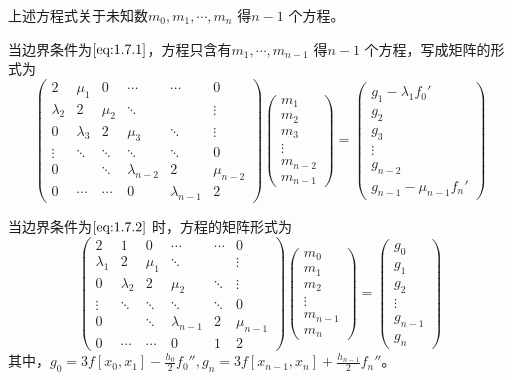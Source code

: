 \documentclass[a4paper]{article}
\begin{document}
上述方程式关于未知数$m_0, m_1, \cdots, m_n$ 得$n-1$ 个方程。

当边界条件为$\ref{eq:1.7.1}$，方程只含有$m_1, \cdots, m_{n-1}$ 得$n-1$ 个方程，写成矩阵的形式为
\[
\begin{pmatrix} 
	2 & \mu_1 & 0 & \cdots & \cdots & 0 \\
	\lambda_2 & 2 & \mu_2 & \ddots & & \vdots \\
	0 & \lambda_3 & 2 & \mu_3 & \ddots & \vdots \\
	\vdots & \ddots & \ddots & \ddots & \ddots & 0 \\
	0 & & \ddots & \lambda_{n-2} & 2 & \mu_{n-2} \\
	0 & \cdots & \cdots & 0 & \lambda_{n-1} & 2
\end{pmatrix} 
\begin{pmatrix} 
	m_1 \\ m_2 \\ m_3 \\ \vdots \\ m_{n-2} \\ m_{n-1}
\end{pmatrix} = 
\begin{pmatrix} 
	g_1 - \lambda_1 f_{0}' \\ g_2 \\ g_3 \\ \vdots \\ g_{n-2} \\ g_{n-1} - \mu_{n-1} f_n'
\end{pmatrix} 
\] 

当边界条件为$\ref{eq:1.7.2}$ 时，方程的矩阵形式为
\[
\begin{pmatrix} 
	2 & 1 & 0 & \cdots & \cdots & 0 \\
	\lambda_1 & 2 & \mu_1 & \ddots & & \vdots \\
	0 & \lambda_2 & 2 & \mu_2 & \ddots & \vdots \\
	\vdots & \ddots & \ddots & \ddots & \ddots & 0 \\
	0 & & \ddots & \lambda_{n-1} & 2 & \mu_{n-1} \\
	0 & \cdots & \cdots & 0 & 1 & 2
\end{pmatrix} 
\begin{pmatrix} 
	m_0 \\ m_1 \\ m_2 \\ \vdots \\ m_{n-1} \\ m_n
\end{pmatrix} = 
\begin{pmatrix} 
	g_{0} \\ g_1 \\ g_2 \\ \vdots \\ g_{n-1} \\ g_n
\end{pmatrix} 
\] 
其中，$g_0 = 3f[x_0, x_1] - \frac{h_0}{2} f_0'', g_n = 3f[x_{n-1}, x_{n}] + \frac{h_{n-1}}{2}f_n''$。
\end{document}
